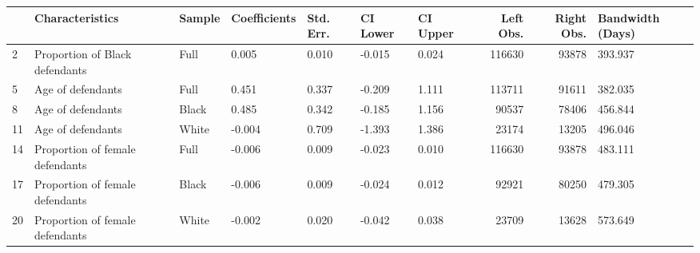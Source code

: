 \begin{tabular}{lllllllrrl}
\toprule
{} &                  Characteristics & Sample & Coefficients & Std. Err. & CI Lower & CI Upper &  Left Obs. &  Right Obs. & Bandwidth (Days) \\
\midrule
2  &   Proportion of Black defendants &   Full &        0.005 &     0.010 &   -0.015 &    0.024 &     116630 &       93878 &          393.937 \\
5  &                Age of defendants &   Full &        0.451 &     0.337 &   -0.209 &    1.111 &     113711 &       91611 &          382.035 \\
8  &                Age of defendants &  Black &        0.485 &     0.342 &   -0.185 &    1.156 &      90537 &       78406 &          456.844 \\
11 &                Age of defendants &  White &       -0.004 &     0.709 &   -1.393 &    1.386 &      23174 &       13205 &          496.046 \\
14 &  Proportion of female defendants &   Full &       -0.006 &     0.009 &   -0.023 &    0.010 &     116630 &       93878 &          483.111 \\
17 &  Proportion of female defendants &  Black &       -0.006 &     0.009 &   -0.024 &    0.012 &      92921 &       80250 &          479.305 \\
20 &  Proportion of female defendants &  White &       -0.002 &     0.020 &   -0.042 &    0.038 &      23709 &       13628 &          573.649 \\
\bottomrule
\end{tabular}
